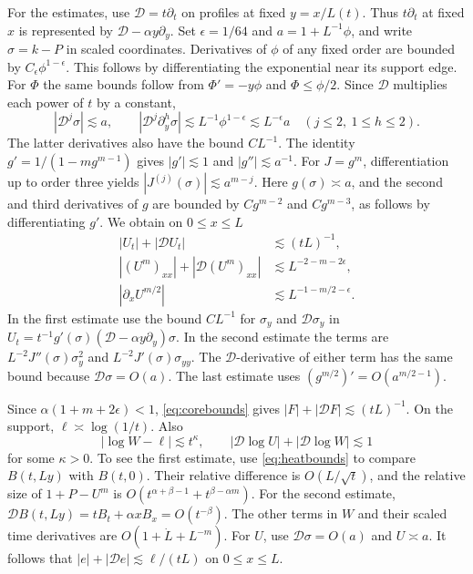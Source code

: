 \documentclass[11pt]{article}
\begin{document}
For the estimates, use \(\mathcal D=t\partial_t\) on profiles at fixed
\(y=x/L(t)\). Thus \(t\partial_t\) at fixed \(x\) is represented by
\(\mathcal D-\alpha y\partial_y\). Set \(\epsilon=1/64\) and
\(a=1+L^{-1}\phi\), and write \(\sigma=k-P\) in scaled coordinates.
Derivatives of \(\phi\) of any fixed order are bounded by
\(C_\epsilon\phi^{1-\epsilon}\). This follows by differentiating the
exponential near its support edge. For \(\Phi\) the same bounds
follow from \(\Phi'=-y\phi\) and \(\Phi\le\phi/2\).
Since \(\mathcal D\) multiplies each power of \(t\) by a constant,
\[
 |\mathcal D^j\sigma|\lesssim a,\qquad
 |\mathcal D^j\partial_y^h\sigma|
 \lesssim L^{-1}\phi^{1-\epsilon}\lesssim L^{-\epsilon}a
 \quad (j\le 2,\ 1\le h\le2).
\]
The latter derivatives also have the bound \(CL^{-1}\).
The identity \(g'=1/(1-mg^{m-1})\) gives \(|g'|\lesssim1\) and
\(|g''|\lesssim a^{-1}\). For \(J=g^m\), differentiation up to order
three yields \(|J^{(j)}(\sigma)|\lesssim a^{m-j}\).
Here \(g(\sigma)\asymp a\), and the second and third derivatives of
\(g\) are bounded by \(Cg^{m-2}\) and \(Cg^{m-3}\), as follows by
differentiating \(g'\).
We obtain on \(0\le x\le L\)
\begin{equation}
\begin{aligned}
 |U_t|+|\mathcal D U_t|&\lesssim (tL)^{-1},\\
 |(U^m)_{xx}|+|\mathcal D (U^m)_{xx}|&\lesssim L^{-2-m-2\epsilon},\\
 |\partial_x U^{m/2}|&\lesssim L^{-1-m/2-\epsilon}.
\end{aligned}
\label{eq:corebounds}
\end{equation}
In the first estimate use the bound \(CL^{-1}\) for \(\sigma_y\)
and \(\mathcal D\sigma_y\) in
\(U_t=t^{-1}g'(\sigma)(\mathcal D-\alpha y\partial_y)\sigma\).
In the second estimate the terms are
\(L^{-2}J''(\sigma)\sigma_y^2\) and
\(L^{-2}J'(\sigma)\sigma_{yy}\). The \(\mathcal D\)-derivative of
either term has the same bound because
\(\mathcal D\sigma=O(a)\). The last estimate uses
\((g^{m/2})'=O(a^{m/2-1})\).

Since \(\alpha(1+m+2\epsilon)<1\), \eqref{eq:corebounds} gives
\(|F|+|\mathcal D F|\lesssim (tL)^{-1}\). On the support,
\(\ell\asymp\log(1/t)\). Also
\begin{equation}
 |\log W-\ell|\lesssim t^\kappa,\qquad
 |\mathcal D\log U|+|\mathcal D\log W|\lesssim1
 \label{eq:logW}
\end{equation}
for some \(\kappa>0\). To see the first estimate, use \eqref{eq:heatbounds}
to compare \(B(t,Ly)\) with \(B(t,0)\). Their relative difference is
\(O(L/\sqrt t)\), and the relative size of \(1+P-U^m\) is
\(O(t^{\alpha+\beta-1}+t^{\beta-\alpha m})\).
For the second estimate,
\(\mathcal D B(t,Ly)=tB_t+\alpha x B_x=O(t^{-\beta})\).
The other terms in \(W\) and their scaled time derivatives are
\(O(1+\dot L+L^{-m})\). For \(U\), use \(\mathcal D\sigma=O(a)\)
and \(U\asymp a\).
It follows that \(|e|+|\mathcal D e|\lesssim\ell/(tL)\) on \(0\le x\le L\).
\end{document}
